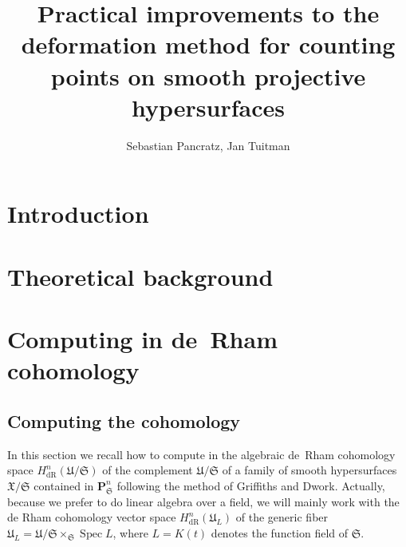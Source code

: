 \documentclass[a4paper,11pt]{article}
\author{Sebastian Pancratz, Jan Tuitman}
\title{Practical improvements to the deformation method for counting points on smooth projective hypersurfaces}
\numberwithin{equation}{section}
\DeclareMathOperator{\Spec}{Spec}        %
\providecommand{\HdR}{H_{\text{dR}}}    %
\theoremstyle{definition}
\begin{document}
\maketitle

\tableofcontents


\section{Introduction}
\label{sec:Introduction}


\section{Theoretical background}
\label{sec:Background}


\section{Computing in de~Rham cohomology}
\subsection{Computing the cohomology}
\label{sec:deRham}

In this section we recall how to compute in the algebraic de~Rham cohomology space 
$\HdR^{n}(\mathfrak{U}/\mathfrak{S})$ of the complement $\mathfrak{U}/\mathfrak{S}$ 
of a family of smooth hypersurfaces $\mathfrak{X}/\mathfrak{S}$ contained in 
$\mathbf{P}^n_{\mathfrak{S}}$ following the method of Griffiths and Dwork. 
Actually, because we prefer to do linear algebra over a field, we will mainly work with 
the de Rham cohomology vector space $\HdR^{n}(\mathfrak{U}_L)$ of the generic fiber 
$\mathfrak{U}_L = \mathfrak{U}/\mathfrak{S} \times_{\mathfrak{S}} \Spec{L}$,
where $L=K(t)$ denotes the function field of $\mathfrak{S}$. 
\end{document}

